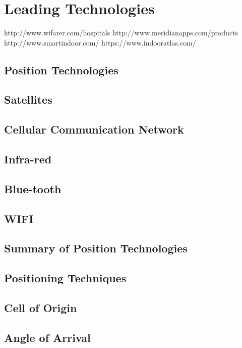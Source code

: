\section{Leading Technologies}

http://www.wifarer.com/hospitals
http://www.meridianapps.com/products
http://www.smartindoor.com/
https://www.indooratlas.com/


\subsection{Position Technologies}

  \subsection{Satellites}

  \subsection{Cellular Communication Network}

  \subsection{Infra-red}

  \subsection{Blue-tooth}

  \subsection{WIFI}

  \subsection{Summary of Position Technologies}

\subsection{Positioning Techniques}

  \subsection{Cell of Origin}

  \subsection{Angle of Arrival}

